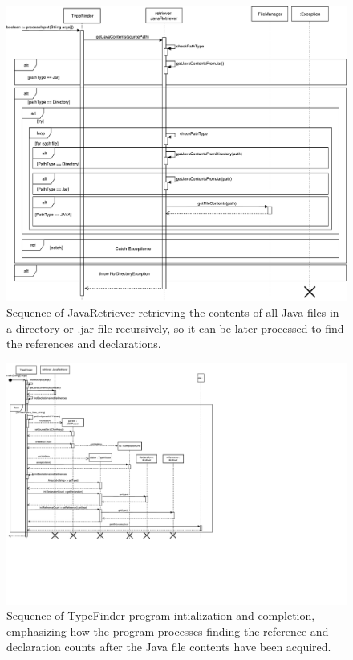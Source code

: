 \documentclass[12p]{article}
\begin{document}
\begin{figure}
  \includegraphics[width=1.0\textwidth]{JavaRetriever-Iteration2.pdf}
  \caption{Sequence of JavaRetriever retrieving the contents of all Java files in a directory or .jar file recursively, so it can be later processed to find the references and declarations.} %
  \label{fig:sequence2}
\end{figure}

\begin{figure}[H]
  \includegraphics[width=1.00\textwidth]{mainTypeFinder-Iteration2.pdf}
  \caption{Sequence of TypeFinder program intialization and completion, emphasizing how the program processes finding the reference and declaration counts after the Java file contents have been acquired.} %
  \label{fig:sequence1}
\end{figure}
\end{document}
